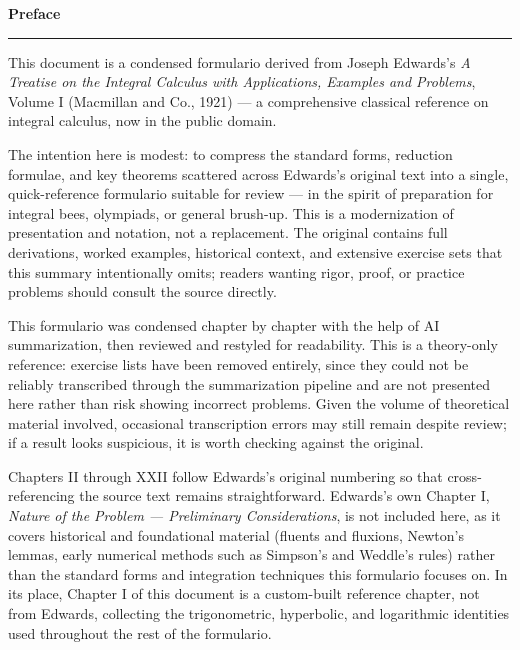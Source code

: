 \documentclass[11pt, a4paper]{article}
\begin{document}
\begin{center}
    {\LARGE \bfseries \color{accent} Preface}\\
    \vspace{0.2cm}
    {\color{accent}\rule{0.55\linewidth}{0.8pt}}
\end{center}
\vspace{0.35cm}

This document is a condensed formulario derived from Joseph Edwards's \textit{A Treatise on the Integral Calculus with Applications, Examples and Problems}, Volume I (Macmillan and Co., 1921) --- a comprehensive classical reference on integral calculus, now in the public domain.

The intention here is modest: to compress the standard forms, reduction formulae, and key theorems scattered across Edwards's original text into a single, quick-reference formulario suitable for review --- in the spirit of preparation for integral bees, olympiads, or general brush-up. This is a modernization of presentation and notation, not a replacement. The original contains full derivations, worked examples, historical context, and extensive exercise sets that this summary intentionally omits; readers wanting rigor, proof, or practice problems should consult the source directly.

This formulario was condensed chapter by chapter with the help of AI summarization, then reviewed and restyled for readability. This is a theory-only reference: exercise lists have been removed entirely, since they could not be reliably transcribed through the summarization pipeline and are not presented here rather than risk showing incorrect problems. Given the volume of theoretical material involved, occasional transcription errors may still remain despite review; if a result looks suspicious, it is worth checking against the original.

Chapters II through XXII follow Edwards's original numbering so that cross-referencing the source text remains straightforward. Edwards's own Chapter I, \textit{Nature of the Problem --- Preliminary Considerations}, is not included here, as it covers historical and foundational material (fluents and fluxions, Newton's lemmas, early numerical methods such as Simpson's and Weddle's rules) rather than the standard forms and integration techniques this formulario focuses on. In its place, Chapter I of this document is a custom-built reference chapter, not from Edwards, collecting the trigonometric, hyperbolic, and logarithmic identities used throughout the rest of the formulario.
\end{document}
